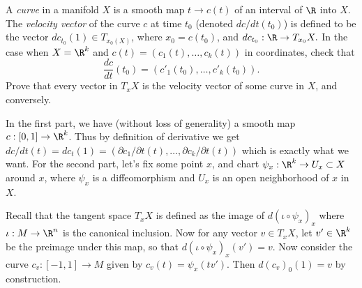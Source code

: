\documentclass[11pt,letterpaper]{article}
\begin{document}
\begin{problem}
    A \emph{curve} in a manifold $X$ is a smooth map $t \to c(t)$ of an interval of $\R$ into $X$. The \emph{velocity vector} of the curve $c$ at time $t_0$ (denoted $dc /dt(t_0)$) is defined to be the vector $dc_{t_0}(1)\in T_{x_0(X)}$, where $x_0=c(t_0)$, and $dc_{t_0} : \R \to T_{x_0}X.$ In the case when $X=\R^k$ and $c(t)=(c_1(t),\ldots,c_k(t))$ in coordinates, check that
    \[
        \frac{dc}{dt}(t_0) = (c'_1(t_0),\ldots,c'_k(t_0))
    .\]  
    Prove that every vector in $T_xX$ is the velocity vector of some curve in $X$, and conversely.
\end{problem}

\begin{solution}
    \quad In the first part, we have (without loss of generality) a smooth map $c : [0,1] \to \R^k$. Thus by definition of derivative we get $dc /dt (t) = dc_t(1) = \left(\partial c_1 /\partial t (t), \ldots, \partial c_k /\partial t(t)\right)$ which is exactly what we want. For the second part, let's fix some point $x$, and chart $\psi_x : \R^k \to U_x\subset X$ around $x$, where $\psi_x$ is a diffeomorphism and $U_x$ is an open neighborhood of $x$ in $X$. 

    \quad Recall that the tangent space $T_x X$ is defined as the image of $d(\iota \circ \psi_x)_x$ where $\iota : M \to \R^n$ is the canonical inclusion. Now for any vector $v\in T_x X$, let $v'\in \R^k$ be the preimage under this map, so that $d(\iota\circ \psi_x)_x(v')=v$. Now consider the curve $c_v : [-1,1] \to M$ given by $c_v(t)=\psi_x(tv')$. Then $d(c_v)_0(1) = v$ by construction.
\end{solution}
\end{document}
